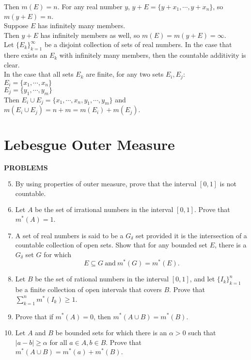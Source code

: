 \begin{enumerate}
    Then $m(E)=n$. For any real number $y$, $y+E = \{y+x_1,\cdots,y+x_n\}$, so $m(y+E)=n$.\\
    Suppose $E$ has infinitely many members.\\
    Then $y+E$ has infinitely members as well, so $m(E)=m(y+E)=\infty$.\\
    Let $\{E_k\}_{k=1}^\infty$ be a disjoint collection of sets of real numbers.
    In the case that there exists an $E_k$ with infinitely many members, then the countable additivity is clear.
    \\In the case that all sets $E_k$ are finite, for any two sets $E_i,E_j$:\\
    $E_i = \{x_1,\cdots,x_n\}$\\
    $E_j = \{y_1,\cdots,y_m\}$\\  
    Then $E_i\cup E_j = \{x_1,\cdots,x_n,y_1,\cdots,y_m\}$ and $m(E_i\cup E_j)=n+m=m(E_i) +m(E_j)$.
\end{enumerate}

\section{Lebesgue Outer Measure}

\begin{center}
	\textbf{PROBLEMS}
\end{center}
\begin{enumerate}
	\setcounter{enumi}{4}
	\item By using properties of outer measure, prove that the interval $[0,1]$ is not countable.
	\item Let $A$ be the set of irrational numbers in the interval $[0,1]$. Prove that $m^*(A)=1$.
	\item A set of real numbers is said to be a $G_\delta$ set provided it is the intersection of a countable collection of open sets.
	Show that for any bounded set $E$, there is a $G_\delta$ set $G$ for which
	\[E\subseteq G \ \text{and}\ m^*(G)=m^*(E).\]
	\item Let $B$ be the set of rational numbers in the interval $[0,1]$, and let $\{I_k\}_{k=1}^n$ be a finite collection of open intervals that covers $B$.
	Prove that $\textstyle \sum_{k=1}^n m^*(I_k) \ge 1$.
	\item Prove that if $m^*(A)=0$, then $m^*(A\cup B) = m^*(B)$.
	\item Let $A$ and $B$ be bounded sets for which there is an $\alpha >0$ such that $|a-b| \ge \alpha$ for all $a \in A, b \in B$.
	Prove that $m^*(A \cup B) = m^*(a)+m^*(B)$.
\end{enumerate}



